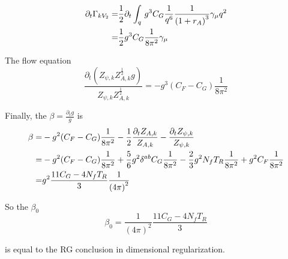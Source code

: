 \documentclass[UTF8]{ctexart}
\begin{document}
\begin{align}
\partial_{t}\Gamma_{kV_2}
=&\frac{1}{2}\partial_{t}\int_{q}\,g^3 C_{G}\frac{1}{q^6}\frac{1}{{(1+r_{A})}^3}\gamma_{\mu}q^{2}
\notag\\=&\frac{1}{2}g^{3}C_G\frac{1}{8{\pi}^2}\gamma_{\mu}
\end{align}
\par The flow equation
\begin{equation}
\frac{\partial_{t}(Z_{\psi,k}Z_{A,k}^{\frac{1}{2}}g)}{Z_{\psi,k}Z_{A,k}^{\frac{1}{2}}}=-g^{3}(C_{F}-C_{G})\frac{1}{8{\pi}^2}
\end{equation}
\par Finally, the $\beta=\frac{\partial_{t}g}{g}$ is
\begin{align}
\beta
=&-g^{2}(C_{F}-C_{G})\frac{1}{8{\pi}^2}-\frac{1}{2}\frac{\partial_{t}Z_{A,k}}{Z_{A,k}}-\frac{\partial_{t}Z_{\psi,k}}{Z_{\psi,k}}
\notag\\=&-g^{2}(C_{F}-C_{G})\frac{1}{8{\pi}^2}+\frac{5}{6}g^{2}\delta^{ab}C_{G}\frac{1}{8\pi^2}-\frac{2}{3}g^{2}N_{f}T_{R}\frac{1}{8\pi^2}+g^{2}C_F\frac{1}{8{\pi}^2}
\notag\\=&g^{2}\frac{11C_{G}-4N_{f}T_{R}}{3}\frac{1}{{(4\pi)}^2}
\end{align}
\par So the $\beta_0$ 
\begin{equation}
\beta_{0}=\frac{1}{{(4\pi)}^2}\frac{11C_{G}-4N_{f}T_{R}}{3}
\end{equation}
\par is equal to the RG conclusion in dimensional regularization.
\end{document}
